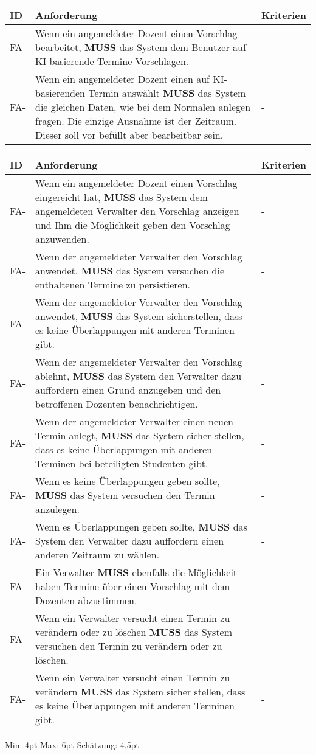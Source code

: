 \newpage

\begin{tabular} {|p{}|p{11cm}|p{}|}
	\hline
	ID & Anforderung & Kriterien \\
	\hline
	FA-
	& Wenn ein angemeldeter Dozent einen Vorschlag bearbeitet, \textbf{MUSS} das System dem Benutzer auf KI-basierende Termine Vorschlagen. 
	& - \\
	\hline
	FA-
	& Wenn ein angemeldeter Dozent einen auf KI-basierenden Termin auswählt \textbf{MUSS} das System die gleichen Daten, wie bei dem Normalen anlegen fragen. Die einzige Ausnahme ist der Zeitraum. Dieser soll vor befüllt aber bearbeitbar sein. 
	& - \\
	\hline
\end{tabular}

\begin{tabular} {|p{}|p{11cm}|p{}|}
	\hline
	ID & Anforderung & Kriterien \\
	\hline
	FA-
	& Wenn ein angemeldeter Dozent einen Vorschlag eingereicht hat, \textbf{MUSS} das System dem angemeldeten Verwalter den Vorschlag anzeigen und Ihm die Möglichkeit geben den Vorschlag anzuwenden. 
	& - \\
	\hline
	FA-
	& Wenn der angemeldeter Verwalter den Vorschlag anwendet, \textbf{MUSS} das System versuchen die enthaltenen Termine zu persistieren.
	& - \\
	\hline
	FA-
	& Wenn der angemeldeter Verwalter den Vorschlag anwendet, \textbf{MUSS} das System sicherstellen, dass es keine Überlappungen mit anderen Terminen gibt.
	& - \\
	\hline
	FA-
	& Wenn der angemeldeter Verwalter den Vorschlag ablehnt, \textbf{MUSS} das System den Verwalter dazu auffordern einen Grund anzugeben und den betroffenen Dozenten benachrichtigen.
	& - \\
	\hline
	FA-
	& Wenn der angemeldeter Verwalter einen neuen Termin anlegt, \textbf{MUSS} das System sicher stellen, dass es keine Überlappungen mit anderen Terminen bei beteiligten Studenten gibt.
	& - \\
	\hline
	FA-
	& Wenn es keine Überlappungen geben sollte, \textbf{MUSS} das System versuchen den Termin anzulegen.
	& - \\
	\hline
	FA-
	& Wenn es Überlappungen geben sollte, \textbf{MUSS} das System den Verwalter dazu auffordern einen anderen Zeitraum zu wählen.
	& - \\
	\hline
	FA-
	& Ein Verwalter \textbf{MUSS} ebenfalls die Möglichkeit haben Termine über einen Vorschlag mit dem Dozenten abzustimmen.
	& - \\
	\hline
	FA-
	& Wenn ein Verwalter versucht einen Termin zu verändern oder zu löschen \textbf{MUSS} das System versuchen den Termin zu verändern oder zu löschen.
	& - \\
	\hline
	FA-
	& Wenn ein Verwalter versucht einen Termin zu verändern \textbf{MUSS} das System sicher stellen, dass es keine Überlappungen mit anderen Terminen gibt.
	& - \\
	\hline
\end{tabular}
Min: 4pt
Max: 6pt
Schätzung: 4,5pt

